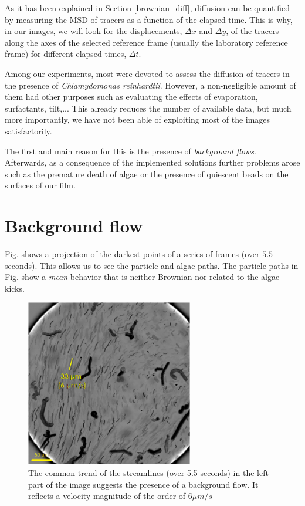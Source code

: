 As it has been explained in Section \ref{brownian_diff}, diffusion can be quantified by measuring the MSD of tracers as a function of the elapsed time. This is why, in our images, we will look for the displacements, $\Delta x$ and $\Delta y$, of the tracers along the axes of the selected reference frame (usually the laboratory reference frame) for different elapsed times, $\Delta t$.

Among our experiments, most were devoted to assess the diffusion of tracers in the presence of \textit{Chlamydomonas reinhardtii}. However, a non-negligible amount of them had other purposes such as evaluating the effects of evaporation, surfactants, tilt,... This already reduces the number of available data, but much more importantly, we have not been able of exploiting most of the images satisfactorily.

The first and main reason for this is the presence of \textit{background flows}. Afterwards, as a consequence of the implemented solutions further problems arose such as the premature death of algae or the presence of quiescent beads on the surfaces of our film.

\section{Background flow}

Fig. \label{backg_flow} shows a projection of the darkest points of a series of frames (over $5.5$ seconds). This allows us to see the particle and algae paths.
The particle paths in Fig. \label{backg_flow} show a \textit{mean} behavior that is neither Brownian nor related to the algae kicks.

\begin{figure}[H]
	\centering
	\includegraphics[width=0.65\textwidth]{archivos/backg_flow.png}
	\caption{The common trend of the streamlines (over 5.5 seconds) in the left part of the image suggests the presence of a background flow. It reflects a velocity magnitude of the order of $6 \mu m / s$}
	\label{backg_flow}
\end{figure}

